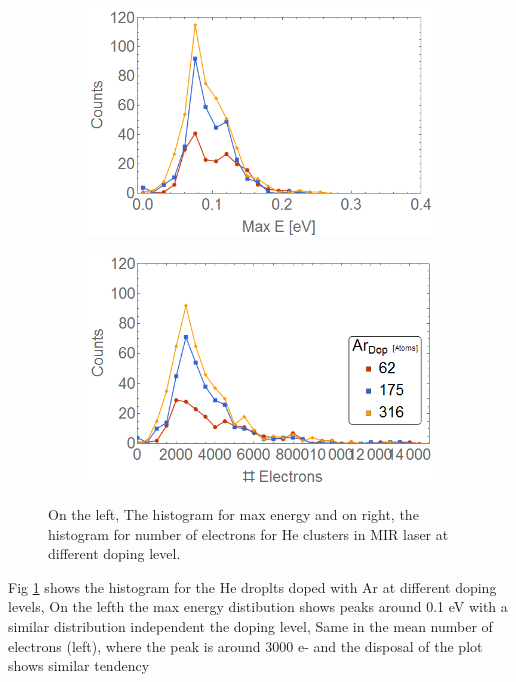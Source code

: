 \begin{figure}[h!]
\centering
\begin{subfigure}[l]{0.49\textwidth}
\includegraphics[width=1\textwidth]{../Images/results/MIR_He_ArDop/Henerg2.png} 
\end{subfigure}
\begin{subfigure}[l]{0.49\textwidth}
\includegraphics[width=1\textwidth]{../Images/results/MIR_He_ArDop/Helec.png}   				\end{subfigure}
\caption[MIR He-Ar. Histograms]{On the left, The histogram for max energy and on right, the histogram for number of electrons for He clusters in MIR laser at different doping level.}
\label{fig:histoArdop}
\end{figure}

Fig \ref{fig:histoArdop} shows the histogram for the He droplts doped with Ar at different doping levels, On the lefth the max energy distibution shows peaks around 0.1 eV with a similar distribution independent the doping level, Same in the mean number of electrons (left), where the peak is around 3000 e- and the disposal of the plot shows similar tendency

